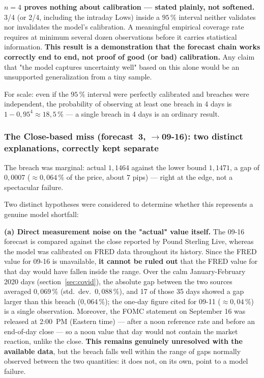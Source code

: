 \documentclass[12pt,a4paper]{article}
\begin{document}
\begin{limitbox}
	\textbf{$n=4$ proves nothing about calibration --- stated
		plainly, not softened.} 3/4 (or 2/4, including the intraday
	Lows) inside a $95\,\%$ interval neither validates
	nor invalidates the model's calibration. A meaningful empirical
	coverage rate requires at minimum several dozen observations
	before it carries statistical information. \textbf{This result is
		a demonstration that the forecast chain works correctly
		end to end, not proof of good (or bad) calibration.} Any
	claim that "the model captures uncertainty well"
	based on this alone would be an unsupported generalization
	from a tiny sample.
	
	For scale: even if the $95\,\%$ interval were perfectly
	calibrated and breaches were independent, the probability
	of observing at least one breach in 4 days is
	$1-0{,}95^4 \approx 18{,}5\,\%$ --- a single breach in 4 days
	is an ordinary result.
	
	
\end{limitbox}

\newpage

\subsubsection{The Close-based miss (forecast~3, $\to$09-16): two distinct explanations, correctly kept separate}

The breach was marginal: actual $1{,}1464$ against the lower
bound $1{,}1471$, a gap of $0{,}0007$ ($\approx 0{,}064\,\%$ of the
price, about 7 pips) --- right at the edge, not a spectacular
failure.

Two distinct hypotheses were considered to determine whether this
represents a genuine model shortfall:

\vspace{0.2cm}

\textbf{(a) Direct measurement noise on the "actual" value
	itself.} The 09-16 forecast is compared against the close reported
by Pound Sterling Live, whereas the model was calibrated on
FRED data throughout its history. Since the FRED value for
09-16 is unavailable, \textbf{it cannot be ruled out} that the
FRED value for that day would have fallen inside the range. Over
the calm January-February 2020 days (section~\ref{sec:covid}), the
absolute gap between the two sources averaged $0{,}069\,\%$
(std.\ dev.\ $0{,}088\,\%$), and 17 of those 35 days showed a gap
larger than this breach ($0{,}064\,\%$); the one-day figure
cited for 09-11 ($\approx 0{,}04\,\%$) is a single observation.
Moreover, the FOMC statement on September 16 was released at 2:00~PM
(Eastern time) --- after a noon reference rate and before an
end-of-day close --- so a noon value that day would not
contain the market reaction, unlike the close.
\textbf{This remains genuinely unresolved with the available
	data}, but the breach falls well within the range
of gaps normally observed between the two quantities: it does not,
on its own, point to a model failure.
\end{document}
